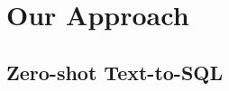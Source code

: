 \section{Our \sys Approach}
\label{sec:preliminary}









\subsection{Zero-shot Text-to-SQL}
\label{sub:problem}

